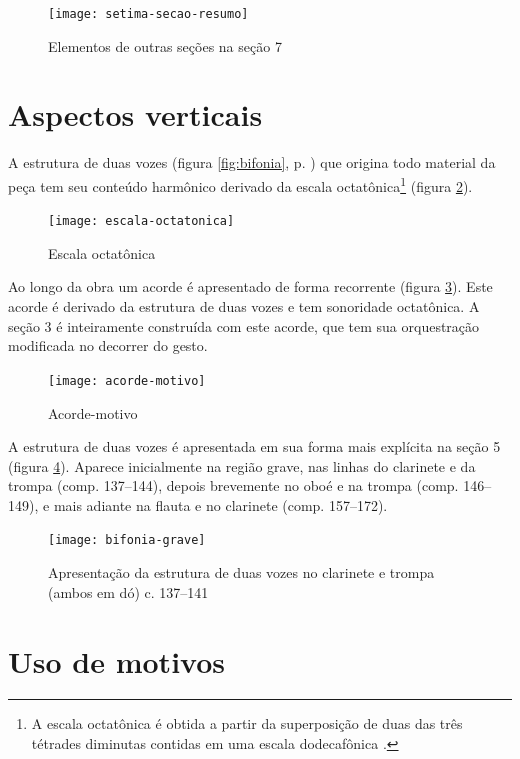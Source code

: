 \begin{figure}
  \centering
  \texttt{[image: setima-secao-resumo]}
  \caption{Elementos de outras seções na seção 7}
  \label{fig:setima-secao-resumo}
\end{figure}
\section{Aspectos verticais}
\label{sec:aspectos-verticais}

A estrutura de duas vozes (figura \ref{fig:bifonia},
p. \pageref{fig:bifonia}) que origina todo material da peça tem seu
conteúdo harmônico derivado da escala octatônica\footnote{A escala
  octatônica é obtida a partir da superposição de duas das três
  tétrades diminutas contidas em uma escala dodecafônica
  \cite[p. 76]{antokoletz90:music}.} (figura
\ref{fig:escala-octatonica}).

\begin{figure}
  \centering
  \texttt{[image: escala-octatonica]}
  \caption{Escala octatônica}
  \label{fig:escala-octatonica}
\end{figure}

Ao longo da obra um acorde é apresentado de forma recorrente (figura
\ref{fig:acorde-motivo}). Este acorde é derivado da estrutura de duas
vozes e tem sonoridade octatônica. A seção 3 é inteiramente construída
com este acorde, que tem sua orquestração modificada no decorrer do
gesto.

\begin{figure}
  \centering
  \texttt{[image: acorde-motivo]}
  \caption{Acorde-motivo}
  \label{fig:acorde-motivo}
\end{figure}

A estrutura de duas vozes é apresentada em sua forma mais explícita na
seção 5 (figura \ref{fig:bifonia-grave}). Aparece inicialmente na
região grave, nas linhas do clarinete e da trompa (comp. 137--144),
depois brevemente no oboé e na trompa (comp. 146--149), e mais adiante
na flauta e no clarinete (comp. 157--172).

\begin{figure}
  \centering
  \texttt{[image: bifonia-grave]}
  \caption{Apresentação da estrutura de duas vozes no clarinete e
    trompa (ambos em dó) c. 137--141}
  \label{fig:bifonia-grave}
\end{figure}
\section{Uso de motivos}
\label{sec:uso-de-motivos}

